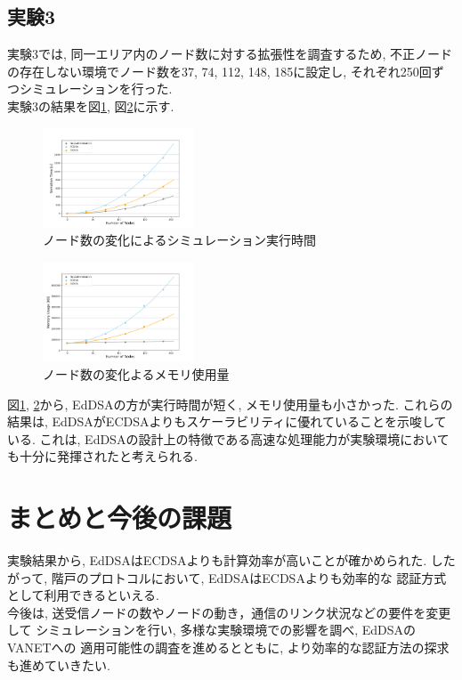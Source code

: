\documentclass[a4j,9pt,twocolumn]{jsarticle}
\begin{document}
\subsection{実験3}
\indent 実験3では, 同一エリア内のノード数に対する拡張性を調査するため, 
不正ノードの存在しない環境でノード数を37, 74, 112, 148, 185に設定し, 
それぞれ250回ずつシミュレーションを行った. \\
\indent 実験3の結果を図\ref{tab:exp3_simtime}, 
図\ref{tab:exp3_memory}に示す. 
\begin{figure}
    \centering
    \includegraphics[width=0.4\textwidth]{figures/exp3_simtime.png}
    \caption{ノード数の変化によるシミュレーション実行時間}
    \vspace{-15pt} %
    \label{tab:exp3_simtime}
\end{figure}
\begin{figure}
    \centering
    \includegraphics[width=0.40\textwidth]{figures/exp3_memory.png}
    \caption{ノード数の変化よるメモリ使用量}
    \vspace{-15pt}
    \label{tab:exp3_memory}
\end{figure}
  
\indent 図\ref{tab:exp3_simtime}, \ref{tab:exp3_memory}から, EdDSAの方が実行時間が短く, メモリ使用量も小さかった. 
これらの結果は, EdDSAがECDSAよりもスケーラビリティに優れていることを示唆している. これは, 
EdDSAの設計上の特徴である高速な処理能力が実験環境においても十分に発揮されたと考えられる. 

\section{まとめと今後の課題}
\indent 実験結果から, EdDSAはECDSAよりも計算効率が高いことが確かめられた. 
したがって, 階戸のプロトコルにおいて, EdDSAはECDSAよりも効率的な
認証方式として利用できるといえる. \\
\indent 今後は, 送受信ノードの数やノードの動き，通信のリンク状況などの要件を変更して
シミュレーションを行い, 多様な実験環境での影響を調べ, EdDSAのVANETへの
適用可能性の調査を進めるとともに, より効率的な認証方法の探求も進めていきたい. 
\end{document}
